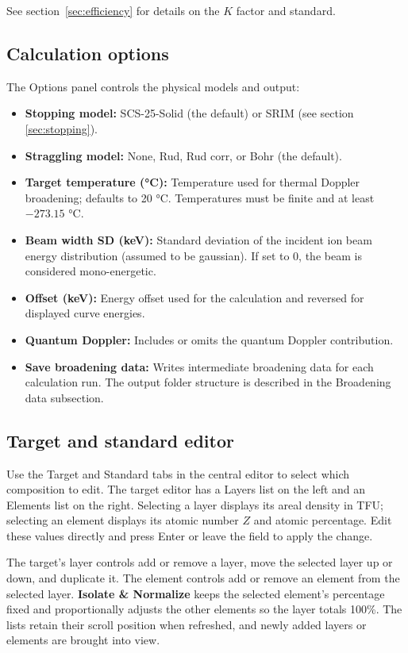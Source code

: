 \documentclass[11pt,a4paper]{article}
\begin{document}
See section~\ref{sec:efficiency} for details on the $K$ factor and standard.

\subsection{Calculation options}
The Options panel controls the physical models and output:
\begin{itemize}
    \item \textbf{Stopping model:} SCS-25-Solid (the default) or SRIM (see section \ref{sec:stopping}).
    \item \textbf{Straggling model:} None, Rud, Rud corr, or Bohr (the default).
    \item \textbf{Target temperature (°C):} Temperature used for thermal Doppler broadening; defaults to 20 °C. Temperatures must be finite and at least $-273.15$ °C.
    \item \textbf{Beam width SD (keV):} Standard deviation of the incident ion beam energy distribution (assumed to be gaussian). If set to 0, the beam is considered mono-energetic.
    \item \textbf{Offset (keV):} Energy offset used for the calculation and reversed for displayed curve energies.
    \item \textbf{Quantum Doppler:} Includes or omits the quantum Doppler contribution.
    \item \textbf{Save broadening data:} Writes intermediate broadening data for each calculation run. The output folder structure is described in the Broadening data subsection.
\end{itemize}

\subsection{Target and standard editor}
Use the Target and Standard tabs in the central editor to select which composition to edit. The target editor has a Layers list on the left and an Elements list on the right. Selecting a layer displays its areal density in TFU; selecting an element displays its atomic number $Z$ and atomic percentage. Edit these values directly and press Enter or leave the field to apply the change.

The target's layer controls add or remove a layer, move the selected layer up or down, and duplicate it. The element controls add or remove an element from the selected layer. \textbf{Isolate \& Normalize} keeps the selected element's percentage fixed and proportionally adjusts the other elements so the layer totals 100\%. The lists retain their scroll position when refreshed, and newly added layers or elements are brought into view.
\end{document}
